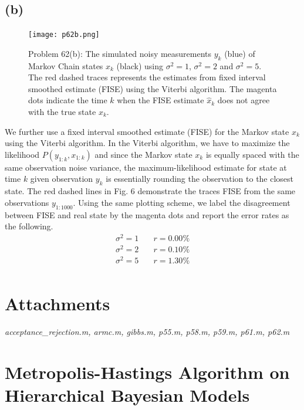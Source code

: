 \documentclass[a4paper, 11pt]{article}
\begin{document}
\subsection*{(b)}

\begin{figure}
	\begin{center}
		\texttt{[image: p62b.png]}
		\caption{Problem 62(b): The simulated noisy measurements $y_k$ (blue) of Markov Chain states $x_k$ (black) using $\sigma^2=1$, $\sigma^2=2$ and $\sigma^2=5$. The red dashed traces represents the estimates from fixed interval smoothed estimate (FISE) using the Viterbi algorithm. The magenta dots indicate the time $k$ when the FISE estimate $\hat{x}_k$ does not agree with the true state $x_k$. } 
	\end{center}
\end{figure}

We further use a fixed interval smoothed estimate (FISE) for the Markov state $x_k$ using the Viterbi algorithm. In the Viterbi algorithm, we have to maximize the likelihood $P(y_{1:k}, x_{1:k})$ and since the Markov state $x_k$ is equally spaced with the same observation noise variance, the maximum-likelihood estimate for state at time $k$ given observation $y_k$ is essentially rounding the observation to the closest state. The red dashed lines in Fig. 6 demonstrate the traces FISE from the same observations $y_{1:1000}$. Using the same plotting scheme, we label the disagreement between FISE and real state by the magenta dots and report the error rates as the following. 
\begin{equation}
\begin{split}
\sigma^2 = 1 \quad & r = 0.00\% \\
\sigma^2 = 2 \quad & r = 0.10\% \\
\sigma^2 = 5 \quad & r = 1.30\% \\
\end{split}
\end{equation}


\section*{Attachments}
\textit{acceptance\_rejection.m, armc.m, gibbs.m, p55.m, p58.m, p59.m, p61.m, p62.m}

\newpage



\section*{Metropolis-Hastings Algorithm on Hierarchical Bayesian Models}
\end{document}

